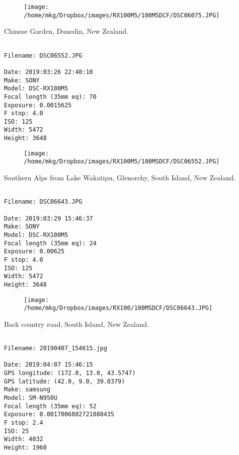 \begin{figure}
\texttt{[image: /home/mkg/Dropbox/images/RX100M5/100MSDCF/DSC06075.JPG]}
\end{figure}
    
\clearpage
\onecolumn
\noindent Chinese Garden, Dunedin, New Zealand.
\noindent
\begin{lstlisting}

Filename: DSC06552.JPG

Date: 2019:03:26 22:40:10
Make: SONY
Model: DSC-RX100M5
Focal length (35mm eq): 70
Exposure: 0.0015625
F stop: 4.0
ISO: 125
Width: 5472
Height: 3648
\end{lstlisting}
\clearpage

\begin{figure}
\texttt{[image: /home/mkg/Dropbox/images/RX100M5/100MSDCF/DSC06552.JPG]}
\end{figure}
    
\clearpage
\onecolumn
\noindent Southern Alps from Lake Wakatipu, Glenorchy, South Island, New Zealand.
\noindent
\begin{lstlisting}

Filename: DSC06643.JPG

Date: 2019:03:29 15:46:37
Make: SONY
Model: DSC-RX100M5
Focal length (35mm eq): 24
Exposure: 0.00625
F stop: 4.0
ISO: 125
Width: 5472
Height: 3648
\end{lstlisting}
\clearpage

\begin{figure}
\texttt{[image: /home/mkg/Dropbox/images/RX100/100MSDCF/DSC06643.JPG]}
\end{figure}
    
\clearpage
\onecolumn
\noindent Back country road, South Island, New Zealand.
\noindent
\begin{lstlisting}

Filename: 20190407_154615.jpg

Date: 2019:04:07 15:46:15
GPS longitude: (172.0, 13.0, 43.5747)
GPS latitude: (42.0, 9.0, 39.0379)
Make: samsung
Model: SM-N950U
Focal length (35mm eq): 52
Exposure: 0.0017006802721088435
F stop: 2.4
ISO: 25
Width: 4032
Height: 1960
\end{lstlisting}
\clearpage


